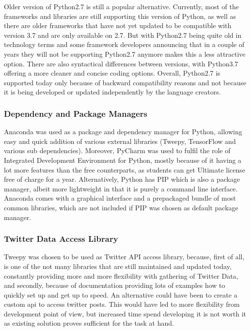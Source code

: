             Older version of Python2.7 is still a popular alternative. Currently, most of the frameworks and libraries are still supporting this version of Python, as well as there are older frameworks that have not yet updated to be compatible with version 3.7 and are only available on 2.7. But with Python2.7 being quite old in technology terms and some framework developers announcing that in a couple of years they will not be supporting Python2.7 anymore makes this a less attractive option. There are also syntactical differences between versions, with Python3.7 offering a more cleaner and concise coding options. Overall, Python2.7 is supported today only because of backward compatibility reasons and not because it is being developed or updated independently by the language creators.
        
        \subsubsection{Dependency and Package Managers}
            Anaconda was used as a package and dependency manager for Python, allowing easy and quick addition of various external libraries (Tweepy, TensorFlow and various sub dependencies). Moreover, PyCharm was used to fulfil the role of Integrated Development Environment for Python, mostly because of it having a lot more features than the free counterparts, as students can get Ultimate license free of charge for a year. Alternatively, Python has PIP which is also a package manager, albeit more lightweight in that it is purely a command line interface. Anaconda comes with a graphical interface and a prepackaged bundle of most common libraries, which are not included if PIP was chosen as default package manager.
            
        \subsubsection{Twitter Data Access Library}
            Tweepy was chosen to be used as Twitter API access library, because, first of all, is one of the not many libraries that are still maintained and updated today, constantly providing more and more flexibility with gathering of Twitter Data, and secondly, because of documentation providing lots of examples how to quickly set up and get up to speed. An alternative could have been to create a custom \gls{api} to access twitter posts. This would have led to more flexibility from development point of view, but increased time spend developing it is not worth it as existing solution proves sufficient for the task at hand.
            
